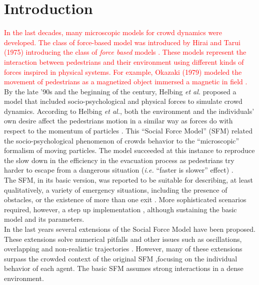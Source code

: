 \documentclass[preprint,12pt]{elsarticle}
\begin{document}

\section{\label{introduction}Introduction}

\textcolor{red}{In the last decades, many microscopic models 
for crowd dynamics were developed. The class of force-based model was introduced by Hirai 
and Tarui (1975) introducing the class of \textit{force based} models 
\cite{Hirai}. These models represent the interaction between 
pedestrians and their environment using different kinds of forces inspired in physical systems. For 
example, Okazaki (1979) modeled the movement of pedestrians as 
a magnetized object immersed a magnetic in field \cite{Okazaki}.}\\

By the late '90s and the beginning of the century, Helbing 
\textit{et al.} proposed a model that included socio-psychological and physical 
forces to simulate crowd dynamics. According to Helbing \textit{et al.}, both 
the environment and the individuals' own desire affect the pedestrians motion in 
a similar way as forces do with respect to the momentum of particles 
\cite{Helbing1,Helbing4}. This ``Social Force Model'' (SFM) related the 
socio-psychological phenomenon of crowds behavior to the ``microscopic'' 
formalism of moving particles. The model succeeded at this instance to 
reproduce the slow down in the efficiency in the evacuation process as 
pedestrians try harder to escape from a dangerous situation (\textit{i.e.} 
``faster is slower'' effect) \cite{Helbing1,Dorso1,Dorso2}. \\ 

The SFM, in its basic version, was reported to be suitable for describing, 
at least qualitatively, a variety of emergency situations, including the presence
of obstacles, or the existence of more than one exit \cite{Dorso3,Dorso5}.
More sophisticated scenarios required, however, a step up implementation
\cite{Cornes1,Dorso4,Dorso6}, although sustaining the basic model and its parameters.  \\

In the last years several extensions of the Social Force Model have been 
proposed. These extensions solve numerical pitfalls \cite{koster1} 
and other issues such as oscillations, overlapping and non-realistic trajectories
\cite{chraibi1,dietrich1}. However, many of these extensions surpass the 
crowded context of the original SFM \cite{Helbing1,Helbing4},focusing on the 
individual behavior of each agent. The basic SFM assumes strong interactions
in a dense environment.\\
\end{document}
